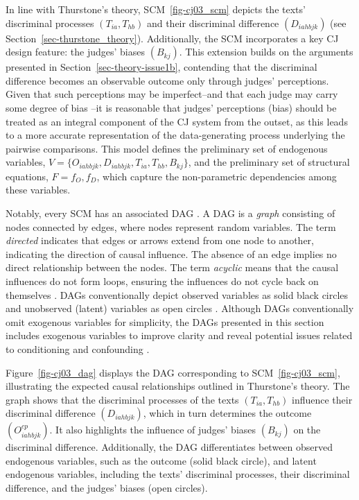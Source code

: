 \documentclass[
  authoryear,
  review,
  1p]{elsarticle}
\begin{document}
In line with Thurstone's theory, SCM~\ref{fig-cj03_scm} depicts the
texts' discriminal processes \((T_{ia}, T_{hb})\) and their discriminal
difference \((D_{iahbjk})\) (see Section~\ref{sec-thurstone_theory}).
Additionally, the SCM incorporates a key CJ design feature: the judges'
biases \((B_{kj})\). This extension builds on the arguments presented in
Section~\ref{sec-theory-issue1b}, contending that the discriminal
difference becomes an observable outcome only through judges'
perceptions. Given that such perceptions may be imperfect--and that each
judge may carry some degree of bias
\citep[see][]{Pollitt_et_al_2003, vanDaal_et_al_2016}--it is reasonable
that judges' perceptions (bias) should be treated as an integral
component of the CJ system from the outset, as this leads to a more
accurate representation of the data-generating process underlying the
pairwise comparisons. This model defines the preliminary set of
endogenous variables,
\(V = \{ O_{iahbjk}, D_{iahbjk}, T_{ia}, T_{hb}, B_{kj} \}\), and the
preliminary set of structural equations, \(F = { f_{O}, f_{D} }\), which
capture the non-parametric dependencies among these variables.

Notably, every SCM has an associated DAG
\citep{Pearl_et_al_2016, Cinelli_et_al_2020}. A DAG is a \emph{graph}
consisting of nodes connected by edges, where nodes represent random
variables. The term \emph{directed} indicates that edges or arrows
extend from one node to another, indicating the direction of causal
influence. The absence of an edge implies no direct relationship between
the nodes. The term \emph{acyclic} means that the causal influences do
not form loops, ensuring the influences do not cycle back on themselves
\citep{McElreath_2020}. DAGs conventionally depict observed variables as
solid black circles and unobserved (latent) variables as open circles
\citep{Morgan_et_al_2014}. Although DAGs conventionally omit exogenous
variables for simplicity, the DAGs presented in this section includes
exogenous variables to improve clarity and reveal potential issues
related to conditioning and confounding \citep{Cinelli_et_al_2020}.

Figure~\ref{fig-cj03_dag} displays the DAG corresponding to
SCM~\ref{fig-cj03_scm}, illustrating the expected causal relationships
outlined in Thurstone's theory. The graph shows that the discriminal
processes of the texts \((T_{ia}, T_{hb})\) influence their discriminal
difference \((D_{iahbjk})\), which in turn determines the outcome
\((O^{cp}_{iahbjk})\). It also highlights the influence of judges'
biases \((B_{kj})\) on the discriminal difference. Additionally, the DAG
differentiates between observed endogenous variables, such as the
outcome (solid black circle), and latent endogenous variables, including
the texts' discriminal processes, their discriminal difference, and the
judges' biases (open circles).
\end{document}
